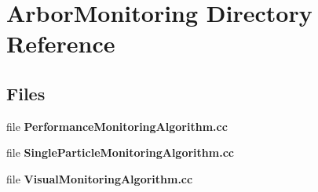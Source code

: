 \section{Arbor\+Monitoring Directory Reference}
\label{dir_719bc9f4fc042cab33d71eeca1658b56}
\subsection*{Files}
\begin{DoxyCompactItemize}
\item 
file {\bf Performance\+Monitoring\+Algorithm.\+cc}
\item 
file {\bf Single\+Particle\+Monitoring\+Algorithm.\+cc}
\item 
file {\bf Visual\+Monitoring\+Algorithm.\+cc}
\end{DoxyCompactItemize}
